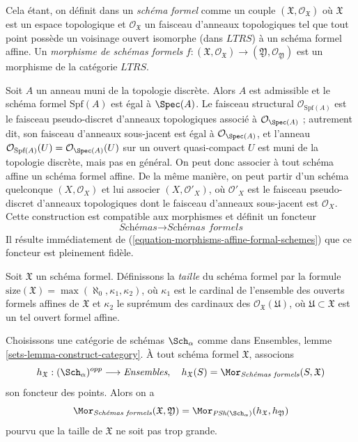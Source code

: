 \medskip\noindent
Cela étant, on définit dans \cite{EGA} un {\it schéma formel} comme un couple
$(\mathfrak X, \mathcal{O}_\mathfrak X)$ où $\mathfrak X$
est un espace topologique et $\mathcal{O}_\mathfrak X$ un faisceau
d'anneaux topologiques tel que tout point possède un voisinage ouvert
isomorphe (dans $LTRS$) à un schéma formel affine.
Un {\it morphisme de schémas formels}
$f : (\mathfrak X, \mathcal{O}_\mathfrak X) \to
(\mathfrak Y, \mathcal{O}_\mathfrak Y)$
est un morphisme de la catégorie $LTRS$.

\medskip\noindent
Soit $A$ un anneau muni de la topologie discrète. Alors $A$ est
admissible et le schéma formel $\text{Spf}(A)$ est égal à
$\Spec(A)$. Le faisceau structural $\mathcal{O}_{\text{Spf}(A)}$
est le faisceau pseudo-discret d'anneaux topologiques associé
à $\mathcal{O}_{\Spec(A)}$ ; autrement dit, son faisceau
d'anneaux sous-jacent est égal à $\mathcal{O}_{\Spec(A)}$, et l'anneau
$\mathcal{O}_{\text{Spf}(A)}(U) = \mathcal{O}_{\Spec(A)}(U)$
sur un ouvert quasi-compact $U$ est muni de la topologie discrète,
mais pas en général. On peut donc associer à tout schéma affine
un schéma formel affine. De la même manière, on peut partir
d'un schéma quelconque $(X, \mathcal{O}_X)$ et lui associer
$(X, \mathcal{O}'_X)$, où $\mathcal{O}'_X$ est le
faisceau pseudo-discret d'anneaux topologiques dont le faisceau
d'anneaux sous-jacent est $\mathcal{O}_X$. Cette construction est
compatible aux morphismes et définit un foncteur
\begin{equation}
\label{equation-compare-schemes-formal-schemes}
\textit{Schémas} \longrightarrow \textit{Schémas formels}
\end{equation}
Il résulte immédiatement de
(\ref{equation-morphisms-affine-formal-schemes})
que ce foncteur est pleinement fidèle.

\medskip\noindent
Soit $\mathfrak X$ un schéma formel. Définissons la {\it taille}
du schéma formel par la formule
$\text{size}(\mathfrak X) = \max(\aleph_0, \kappa_1, \kappa_2)$,
où $\kappa_1$ est le cardinal de l'ensemble des ouverts formels affines de
$\mathfrak X$ et $\kappa_2$ le suprémum des cardinaux
des $\mathcal{O}_\mathfrak X(\mathfrak U)$, où
$\mathfrak U \subset \mathfrak X$ est un tel ouvert formel affine.

\begin{lemma}
\label{lemma-fully-faithful}
Choisissons une catégorie de schémas $\Sch_\alpha$
comme dans Ensembles, lemme \ref{sets-lemma-construct-category}.
À tout schéma formel $\mathfrak X$, associons
$$
h_\mathfrak X : (\Sch_\alpha)^{opp} \longrightarrow \textit{Ensembles},\quad
h_\mathfrak X(S) = \Mor_{\textit{Schémas formels}}(S, \mathfrak X)
$$
son foncteur des points. Alors on a
$$
\Mor_{\textit{Schémas formels}}(\mathfrak X, \mathfrak Y) =
\Mor_{\textit{PSh}(\Sch_\alpha)}(h_\mathfrak X, h_\mathfrak Y)
$$
pourvu que la taille de $\mathfrak X$ ne soit pas trop grande.
\end{lemma}

